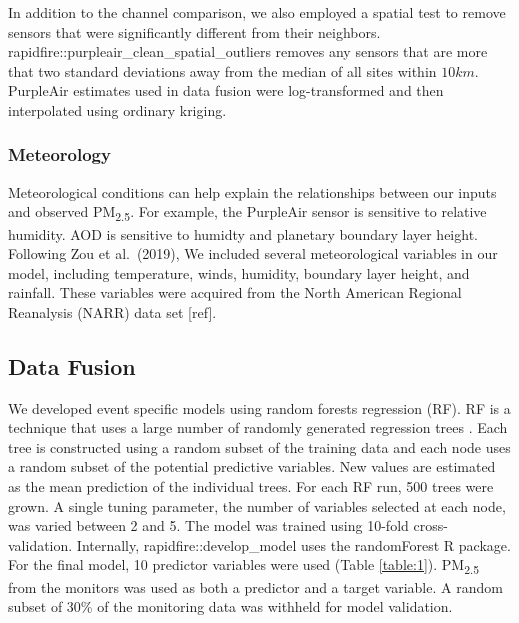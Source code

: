 \documentclass[gmd, manuscript]{copernicus}
\begin{document}
In addition to the channel comparison, we also employed a spatial test
to remove sensors that were significantly different from their
neighbors. rapidfire::purpleair\_clean\_spatial\_outliers removes any
sensors that are more that two standard deviations away from the median
of all sites within \(10\unit {km}\). PurpleAir estimates used in data
fusion were log-transformed and then interpolated using ordinary
kriging.

\subsubsection{Meteorology}

Meteorological conditions can help explain the relationships between our
inputs and observed PM\textsubscript{2.5}. For example, the PurpleAir
sensor is sensitive to relative humidity. AOD is sensitive to humidty
and planetary boundary layer height. Following Zou et al.~(2019), We
included several meteorological variables in our model, including
temperature, winds, humidity, boundary layer height, and rainfall. These
variables were acquired from the North American Regional Reanalysis
(NARR) data set {[}ref{]}.

\subsection{Data Fusion}

We developed event specific models using random forests regression (RF).
RF is a technique that uses a large number of randomly generated
regression trees \citep{Breiman2001}. Each tree is constructed using a
random subset of the training data and each node uses a random subset of
the potential predictive variables. New values are estimated as the mean
prediction of the individual trees. For each RF run, 500 trees were
grown. A single tuning parameter, the number of variables selected at
each node, was varied between 2 and 5. The model was trained using
10-fold cross-validation. Internally, rapidfire::develop\_model uses the
randomForest R package.\\
For the final model, 10 predictor variables were used (Table
\ref{table:1}). PM\textsubscript{2.5} from the monitors was used as both
a predictor and a target variable. A random subset of 30\% of the
monitoring data was withheld for model validation.
\end{document}
